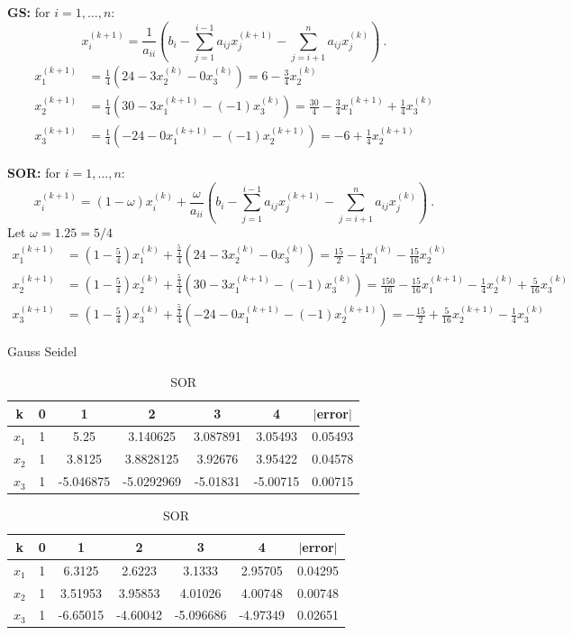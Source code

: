 \documentclass[12pt]{article}
\begin{document}
\textbf{GS:} for $i = 1, \dots, n$:
\[ x^{(k+1)}_i = \frac{1}{a_{ii}}(b_i - \sum_{j=1}^{i-1} a_{ij} x_j^{(k+1)} - \sum_{j=i+1}^{n} a_{ij} x_j^{(k)}) \:.\]
%
\begin{align}
x_1^{(k+1)} &= \frac{1}{4}(24 - 3 x_2^{(k)} - 0 x_3^{(k)}) 
= 6 - \frac{3}{4}x_2^{(k)} \nonumber \\
%
x_2^{(k+1)} &= \frac{1}{4}(30 - 3 x_1^{(k+1)} - (-1) x_3^{(k)}) 
= \frac{30}{4} - \frac{3}{4}x_1^{(k+1)} + \frac{1}{4}x_3^{(k)}\nonumber \\
%
x_3^{(k+1)} &= \frac{1}{4}(-24 - 0 x_1^{(k+1)} - (-1) x_2^{(k+1)}) 
= -6 + \frac{1}{4}x_2^{(k+1)}\nonumber
\end{align}

\textbf{SOR:} for $i = 1, \dots, n$:
\[ x^{(k+1)}_i = (1-\omega)x_i^{(k)} + \frac{\omega}{a_{ii}}(b_i - \sum_{j=1}^{i-1} a_{ij} x_j^{(k+1)} - \sum_{j=i+1}^{n} a_{ij} x_j^{(k)}) \:.\]
%
Let $\omega = 1.25 = 5/4$
%
\begin{align}
x_1^{(k+1)} &= (1-\frac{5}{4})x_1^{(k)} + \frac{\frac{5}{4}}{4}(24 - 3 x_2^{(k)} - 0 x_3^{(k)}) 
= \frac{15}{2} - \frac{1}{4}x_1^{(k)} - \frac{15}{16}x_2^{(k)} \nonumber \\
%
x_2^{(k+1)} &= (1-\frac{5}{4})x_2^{(k)} + \frac{\frac{5}{4}}{4}(30 - 3 x_1^{(k+1)} - (-1) x_3^{(k)}) 
= \frac{150}{16} - \frac{15}{16}x_1^{(k+1)} - \frac{1}{4}x_2^{(k)} + \frac{5}{16}x_3^{(k)}\nonumber \\
%
x_3^{(k+1)} &= (1-\frac{5}{4})x_3^{(k)} + \frac{\frac{5}{4}}{4}(-24 - 0 x_1^{(k+1)} - (-1) x_2^{(k+1)}) 
= -\frac{15}{2} + \frac{5}{16}x_2^{(k+1)} - \frac{1}{4}x_3^{(k)}\nonumber
\end{align}

\begin{table}[h]
  \caption{Gauss Seidel}
  \centering
\begin{tabular}{| c | c | c | c | c | c | c |}
\hline
k & 0 & 1 & 2 & 3 & 4 & $|$error$|$ \\ \hline
$x_1$ & 1 & 5.25 & 3.140625 & 3.087891 & 3.05493 & 0.05493\\ \hline 
$x_2$ & 1 & 3.8125 & 3.8828125 & 3.92676 & 3.95422 & 0.04578 \\ \hline 
$x_3$ & 1 & -5.046875 & -5.0292969 & -5.01831 & -5.00715 & 0.00715 \\ \hline 
\end{tabular}

\vspace*{1 em}
\caption{SOR}
\begin{tabular}{| c | c | c | c | c | c | c |}
\hline
k & 0 & 1 & 2 & 3 & 4 & $|$error$|$ \\ \hline
$x_1$ & 1 & 6.3125 & 2.6223 & 3.1333 & 2.95705 & 0.04295 \\ \hline 
$x_2$ & 1 & 3.51953 & 3.95853 & 4.01026 & 4.00748 & 0.00748 \\ \hline 
$x_3$ & 1 & -6.65015 & -4.60042 & -5.096686 & -4.97349 & 0.02651 \\ \hline 
\end{tabular}
\end{table}



 
\end{document}
